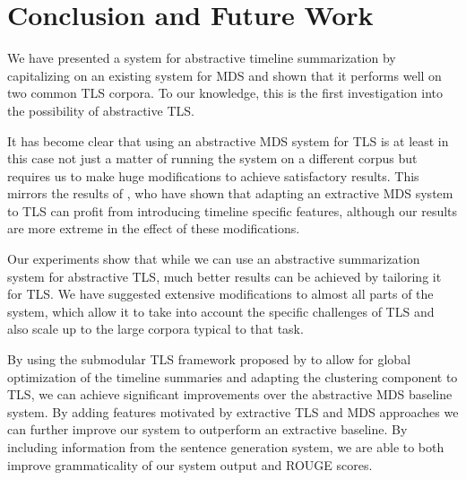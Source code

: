 \documentclass[a4paper,BCOR=10mm]{report}
\numberwithin{lemma}{chapter}
\numberwithin{definition}{chapter}
\begin{document}

\chapter{Conclusion and Future Work}  \label{sec:conclusion}


We have presented a system for abstractive timeline summarization by capitalizing on an existing system for MDS and shown that it performs well on two common TLS corpora. To our knowledge, this is the first investigation into the possibility of abstractive TLS.

It has become clear that using an abstractive MDS system for TLS is at least in this case not just a matter of running the system on a different corpus but requires us to make huge modifications to achieve satisfactory results. This mirrors the results of \citet{markert}, who have shown that adapting an extractive MDS system to TLS can profit from introducing timeline specific features, although our results are more extreme in the effect of these modifications.

Our experiments show that while we can use an abstractive summarization system for abstractive TLS, much better results can be achieved by tailoring it for TLS.
We have suggested extensive modifications to almost all parts of the system, which allow it to take into account the specific challenges of TLS and also scale up to the large corpora typical to that task.

By using the submodular TLS framework proposed by \citet{markert} to allow for global optimization of the timeline summaries and adapting the clustering component to TLS, we can achieve significant improvements over the abstractive MDS baseline system.
By adding features motivated by extractive TLS and MDS approaches we can further improve our system to outperform an extractive baseline.
By including information from the sentence generation system, we are able to both improve grammaticality of our system output and ROUGE scores.
\end{document}
